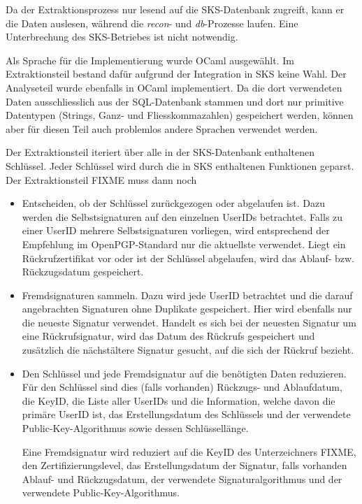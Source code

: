 Da der Extraktionsprozess nur lesend auf die SKS-Datenbank zugreift,
kann er die Daten auslesen, während die \emph{recon}- und
\emph{db}-Prozesse laufen. Eine Unterbrechung des SKS-Betriebes ist
nicht notwendig.

Als Sprache für die Implementierung wurde OCaml ausgewählt. Im
Extraktionsteil bestand dafür aufgrund der Integration in SKS keine
Wahl. Der Analyseteil wurde ebenfalls in OCaml implementiert. Da die
dort verwendeten Daten ausschliesslich aus der SQL-Datenbank stammen
und dort nur primitive Datentypen (Strings, Ganz- und
Fliesskommazahlen) gespeichert werden, können aber für diesen Teil
auch problemlos andere Sprachen verwendet werden.

Der Extraktionsteil iteriert über alle in der SKS-Datenbank
enthaltenen Schlüssel. Jeder Schlüssel wird durch die in SKS
enthaltenen Funktionen geparst. Der Extraktionsteil FIXME muss dann
noch
\begin{itemize}
\item Entscheiden, ob der Schlüssel zurückgezogen oder abgelaufen
  ist. Dazu werden die Selbstsignaturen auf den einzelnen UserIDs
  betrachtet. Falls zu einer UserID mehrere Selbstsignaturen
  vorliegen, wird entsprechend der Empfehlung im OpenPGP-Standard nur
  die aktuellste verwendet. Liegt ein Rückrufzertifikat vor oder ist
  der Schlüssel abgelaufen, wird das Ablauf- bzw. Rückzugsdatum
  gespeichert.
\item Fremdsignaturen sammeln. Dazu wird jede UserID betrachtet und
  die darauf angebrachten Signaturen ohne Duplikate gespeichert. Hier
  wird ebenfalls nur die neueste Signatur verwendet. Handelt es sich
  bei der neuesten Signatur um eine Rückrufsignatur, wird das Datum
  des Rückrufs gespeichert und zusätzlich die nächstältere Signatur
  gesucht, auf die sich der Rückruf bezieht.
\item Den Schlüssel und jede Fremdsignatur auf die benötigten Daten
  reduzieren. Für den Schlüssel sind dies (falls vorhanden) Rückzugs-
  und Ablaufdatum, die KeyID, die Liste aller UserIDs und die
  Information, welche davon die primäre UserID ist, das
  Erstellungsdatum des Schlüssels und der verwendete
  Public-Key-Algorithmus sowie dessen Schlüssellänge.

  Eine Fremdsignatur wird reduziert auf die KeyID des Unterzeichners
  FIXME, den Zertifizierungslevel, das Erstellungsdatum der Signatur,
  falls vorhanden Ablauf- und Rückzugsdatum, der verwendete
  Signaturalgorithmus und der verwendete Public-Key-Algorithmus.
\end{itemize}

